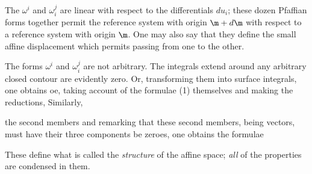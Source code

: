 The $\omega^i$ and $\omega_i^j$ are linear with respect to the differentials $du_i$; these dozen Pfaffian forms together permit  the reference system with origin $\m + d\m$ with respect to a reference system with origin $\m$. One may also say that they define the small affine displacement which permits passing from one to the other.

The forms $\omega^i$ and $\omega_i^j$ are not arbitrary. The integrals
extend around any arbitrary closed contour are evidently zero. Or, transforming them into surface integrals, one obtains
oe, taking account of the formulae (1) themselves and making the reductions,
Similarly,

 the second members and remarking that these second members, being vectors, must have their three components be zeroes, one obtains the formulae

These define what is called the \textit{structure} of the affine space; \textit{all} of the properties are condensed in them.

%